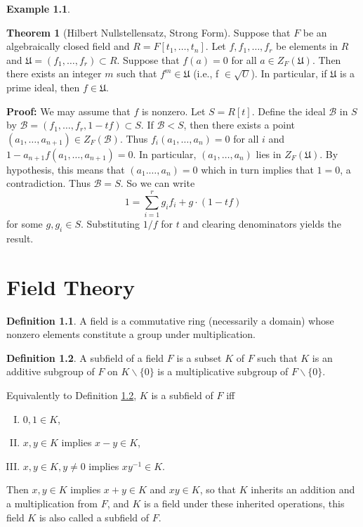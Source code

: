 \documentclass[11pt]{amsbook}%
\newcommand{\ii}{\item}
\theoremstyle{plain}
\theoremstyle{definition}
\newtheorem{definition*}{Definition}
\newtheorem*{example*}{Example}
\newtheorem{theorem}{Theorem}
\numberwithin{equation}{section}
\newcommand{\BC}{\mathcal B}
\newcommand{\UF}{\mathfrak U}
\renewcommand{\proof}{ \textbf{Proof: }}
\renewcommand{\ie}{i.e., }
\begin{document}
\begin{example*}
\begin{theorem}[Hilbert Nullstellensatz, Strong Form]
  Suppose that $F$ be an algebraically closed field and $R = F[t_{1}, \dots, t_{n}]$.
  Let $f, f_{1}, \dots, f_{r}$ be elements in $R$ and $\UF = (f_{1}, \dots, f_{r}) \subset R$.
  Suppose that $f(a) = 0$ for all $a \in Z_{F}(\UF)$. Then there exists an integer
  $m$ such that $f^{m} \in \UF$ (\ie f $\in \sqrt{U}$). In particular, if
  $\UF$ is a prime ideal, then $f \in \UF$.
\end{theorem} \vspace{1.8em}
\proof We may assume that $f$ is nonzero. Let $S = R[t]$. Define the ideal $\BC$ in
$S$ by $\BC = (f_{1}, \dots, f_{r}, 1-tf) \subset S$. If $\BC < S$, then there
exists a point $(a_{1}, \dots, a_{n+1}) \in Z_{F}(\BC)$. Thus $f_{i}(a_{1}, \dots, a_{n}) = 0$
for all $i$ and $1-a_{n+1}f(a_{1}, \dots, a_{n+1}) = 0$. In particular,
$(a_{1}, \dots, a_{n})$ lies in $Z_{F}(\UF)$. By hypothesis, this means that $(a_{1}. \dots, a_{n}) = 0$
which in turn implies that $1 = 0$, a contradiction. Thus $\BC = S$. So we can write
$$
1 = \sum_{i=1}^{r} g_{i}f_{i} + g \cdot (1-tf)
$$
for some $g, g_{i} \in S$. Substituting $1/f$ for $t$ and clearing denominators yields the
result. \qedsymbol

  
\chapter{Field Theory}

\begin{definition*}
  \label{def-field}
  A field is a commutative ring (necessarily a domain) whose nonzero elements
  constitute a group under multiplication.
\end{definition*}

\begin{definition*}
  \label{def-subfield}
  A subfield of a field $F$ is a subset $K$ of $F$ such that $K$ is an
  additive subgroup of $F$ on $K \backslash \{0\}$ is a multiplicative subgroup
  of $F \backslash \{0\}$.
\end{definition*}
Equivalently to Definition \ref{def-subfield}, $K$ is a subfield of $F$ iff
\begin{enumerate}[I. ]
    \ii $0, 1 \in K$,
    \ii $x, y \in K$ implies $x-y \in K$,
    \ii $x, y \in K, y \neq 0$ implies $xy^{-1} \in K$.
\end{enumerate}
Then $x, y \in K$ implies $x+y \in K$ and $xy \in K$, so that $K$ inherits an addition
and a multiplication from $F$, and $K$ is a field under these inherited operations,
this field $K$ is also called a subfield of $F$.


\end{example*}
\end{document}
